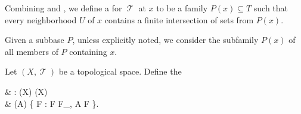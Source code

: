 \begin{definition}\label{def:topological_local_subbase}
  Combining  and , we define a  for \( \mscrT \) at \( x \) to be a family \( P(x) \subseteq T \) such that every neighborhood \( U \) of \( x \) contains a finite intersection of sets from \( P(x) \).

  Given a subbase \( P \), unless explicitly noted, we consider the subfamily \( P(x) \) of all members of \( P \) containing \( x \).
\end{definition}

\begin{definition}\label{def:topological_closure_operator}
  Let \( (X, \mscrT) \) be a topological space. Define the 
  \begin{balign*}
     & \cl: \pow(X) \to \pow(X)                                           \\
     & \cl(A) \coloneqq \bigcap \{ F : F \in F_\mscrT, A \subseteq F \}.
  \end{balign*}
\end{definition}

